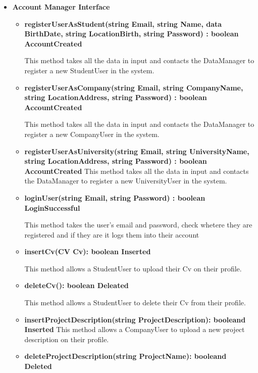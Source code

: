 \begin{itemize}
\item \textbf{Account Manager Interface}
    \begin{itemize}
    \item \textbf{registerUserAsStudent(string Email, string Name, data BirthDate, string LocationBirth, string Password) : boolean AccountCreated}

    This method takes all the data in input and contacts the DataManager to register a new StudentUser in the system.

    \item \textbf{registerUserAsCompany(string Email, string CompanyName, string LocationAddress, string Password) : boolean AccountCreated}
    
    This method takes all the data in input and contacts the DataManager to register a new CompanyUser in the system.

    \item \textbf{registerUserAsUniversity(string Email, string UniversityName, string LocationAddress, string Password) : boolean AccountCreated}
    This method takes all the data in input and contacts the DataManager to register a new UniversityUser in the system.

    \item \textbf{loginUser(string Email, string Password) : boolean LoginSuccessful}
    
    This method takes the user's email and password, check whetere they are registered and if they are it logs them into their account

    \item \textbf{insertCv(CV Cv): boolean Inserted}
    
    This method allows a StudentUser to upload their Cv on their profile. 

    \item \textbf{deleteCv(): boolean Deleated}
    
    This method allows a StudentUser to delete their Cv from their profile.
    
    \item \textbf{insertProjectDescription(string ProjectDescription): booleand Inserted}
    This method allows a CompanyUser to upload a new project description on their profile.

    \item \textbf{deleteProjectDescription(string ProjectName): booleand Deleted}
    

\end{itemize}
\end{itemize}
